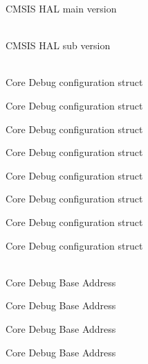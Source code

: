 \begin{DoxyRefList}
\label{deprecated__deprecated000657}%
%
\+[31:\+16]\+ CMSIS HAL main version  
\item[{\parbox[t]{\linewidth}{Global \doxylink{core__sc300_8h_a664c9e59952455ddeee28173b864fe9d}{\+\_\+\+\_\+\+SC300\+\_\+\+CMSIS\+\_\+\+VERSION\+\_\+\+SUB} }}]\hfill \\
\label{deprecated__deprecated000658}%
%
\+[15:\+0]\+ CMSIS HAL sub version  
\item[{\parbox[t]{\linewidth}{Global \doxylink{group__CMSIS__CoreDebug_gab6e30a2b802d9021619dbb0be7f5d63d}{Core\+Debug} }}]\hfill \\
\label{deprecated__deprecated000100}%
%
Core Debug configuration struct 

\label{deprecated__deprecated000154}%
%
Core Debug configuration struct 

\label{deprecated__deprecated000230}%
%
Core Debug configuration struct 

\label{deprecated__deprecated000293}%
%
Core Debug configuration struct 

\label{deprecated__deprecated000372}%
%
Core Debug configuration struct 

\label{deprecated__deprecated000448}%
%
Core Debug configuration struct 

\label{deprecated__deprecated000551}%
%
Core Debug configuration struct 

\label{deprecated__deprecated000653}%
%
Core Debug configuration struct  
\item[{\parbox[t]{\linewidth}{Global \doxylink{group__CMSIS__CoreDebug_ga680604dbcda9e9b31a1639fcffe5230b}{Core\+Debug\+\_\+\+BASE} }}]\hfill \\
\label{deprecated__deprecated000099}%
%
Core Debug Base Address 

\label{deprecated__deprecated000153}%
%
Core Debug Base Address 

\label{deprecated__deprecated000229}%
%
Core Debug Base Address 

\label{deprecated__deprecated000292}%
%
Core Debug Base Address 


\end{DoxyRefList}
